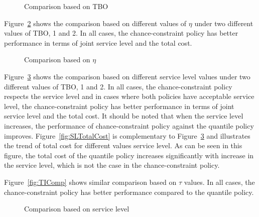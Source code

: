 \documentclass[10pt]{article}
\begin{document}
\begin{figure}[H]
    \centering
    \caption{Comparison based on TBO}%
    \label{fig:TBOComp}%
\end{figure}


Figure~\ref{fig:ETAComp} shows the comparison based on different values of $\eta$ under two different values of TBO, 1 and 2. In all cases, the chance-constraint policy has better performance in terms of joint service level and the total cost. 

\begin{figure}%
    \centering
    \caption{Comparison based on $\eta$}%
    \label{fig:ETAComp}%
\end{figure}

Figure~\ref{fig:SLComp} shows the comparison based on different service level values under two different values of TBO, 1 and 2. In all cases, the chance-constraint policy respects the service level and in cases where both policies have acceptable service level, the chance-constraint policy has better performance in terms of joint service level and the total cost. It should be noted that when the service level increases, the performance of chance-constraint policy against the quantile policy improves. Figure~\ref{fig:SLTotalCost} is complementary to Figure~\ref{fig:SLComp} and illustrates the trend of total cost for different values service level. As can be seen in this figure, the total cost of the quantile policy increases significantly with increase in the service level, which is not the case in the chance-constraint policy.

Figure~\ref{fig:TIComp} shows similar comparison based on $\tau$ values. In all cases, the chance-constraint policy has better performance compared to the quantile policy.

\begin{figure}[H]
    \centering
    \caption{Comparison based on service level}%
    \label{fig:SLComp}%
\end{figure}
\end{document}
